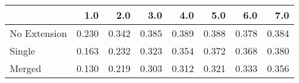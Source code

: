 \begin{tabular}{lrrrrrrr}
\toprule
{} &   1.0 &   2.0 &   3.0 &   4.0 &   5.0 &   6.0 &   7.0 \\
\midrule
No Extension & 0.230 & 0.342 & 0.385 & 0.389 & 0.388 & 0.378 & 0.384 \\
Single       & 0.163 & 0.232 & 0.323 & 0.354 & 0.372 & 0.368 & 0.380 \\
Merged       & 0.130 & 0.219 & 0.303 & 0.312 & 0.321 & 0.333 & 0.356 \\
\bottomrule
\end{tabular}
